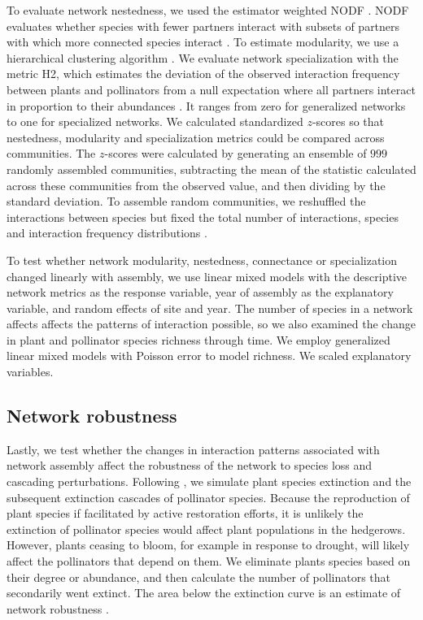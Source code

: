 \documentclass[12pt]{article}
\begin{document}
To evaluate network nestedness, we used the estimator weighted NODF
\citep{almeida-neto-2008-1227}. NODF evaluates whether species with
fewer partners interact with subsets of partners with which more
connected species interact \citep{almeida-neto-2008-1227}. To estimate
modularity, we use a hierarchical clustering algorithm
\citep{Newman2004, csardi-2006}. We evaluate network specialization with
the metric H2, which estimates the deviation of the observed
interaction frequency between plants and pollinators from a null
expectation where all partners interact in proportion to their
abundances \citep{bluthgen-2006-9}. It ranges from zero for
generalized networks to one for specialized networks.  We calculated
standardized $z$-scores so that nestedness, modularity and
specialization metrics could be compared across communities. The
$z$-scores were calculated by generating an ensemble of $999$ randomly
assembled communities, subtracting the mean of the statistic
calculated across these communities from the observed value, and then
dividing by the standard deviation. To assemble random communities, we
reshuffled the interactions between species but fixed the total number
of interactions, species and interaction frequency distributions
\citep{Galeano2009}.

To test whether network modularity, nestedness, connectance or
specialization changed linearly with assembly, we use linear mixed
models with the descriptive network metrics as the response variable,
year of assembly as the explanatory variable, and random effects of
site and year. The number of species in a network affects affects the
patterns of interaction possible, so we also examined the change in
plant and pollinator species richness through time. We employ
generalized linear mixed models with Poisson error to model
richness. We scaled explanatory variables.


\subsection*{Network robustness}
Lastly, we test whether the changes in interaction patterns associated
with network assembly affect the robustness of the network to species
loss and cascading perturbations. Following \cite{Memmott2004}, we
simulate plant species extinction and the subsequent extinction
cascades of pollinator species. Because the reproduction of plant
species if facilitated by active restoration efforts, it is unlikely
the extinction of pollinator species would affect plant populations in
the hedgerows. However, plants ceasing to bloom, for example in
response to drought, will likely affect the pollinators that depend on
them. We eliminate plants species based on their degree or abundance,
and then calculate the number of pollinators that secondarily went
extinct. The area below the extinction curve is an estimate of network
robustness \citep{Memmott2004, bipartite}.
\end{document}
